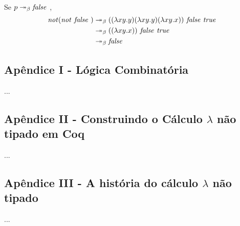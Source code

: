 \documentclass[../main.tex]{subfiles}
\begin{document}
\begin{enumerate}
\begin{equation*}
\begin{split}
        \end{split}
    \end{equation*}
    Se $p \twoheadrightarrow_{\beta} \text{\emph{false }}$,
    \begin{equation*}
        \begin{split}
            \text{\emph{not}}(\text{\emph{not }} \text{\emph{false }}) & \twoheadrightarrow_{\beta} ((\lambda xy . y) (\lambda xy . y) (\lambda xy . x)) \text{\emph{ false }} \text{\emph{true }} \\ & \twoheadrightarrow_{\beta} ((\lambda xy . x)) \text{\emph{ false }} \text{\emph{true }} \\ & \twoheadrightarrow_{\beta} \text{\emph{false }}
        \end{split}
    \end{equation*}
\end{enumerate}


\subsection{Apêndice I - Lógica Combinatória}

...

\subsection{Apêndice II - Construindo o Cálculo $\lambda$ não tipado em Coq}

...

\subsection{Apêndice III - A história do cálculo $\lambda$ não tipado}

...
\end{document}
